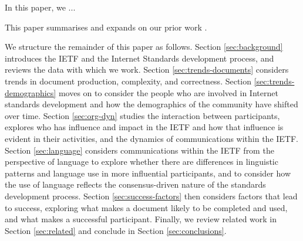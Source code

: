 \documentclass[twocolumn,10pt]{article}
\begin{document}




In this paper, we ...



This paper summarises and expands on our prior work
\cite{mcquistin:2021:characterising,khare:2022:web-we-weave,
healey:2023:power,mcquistin:2023:errare,khare:2023:tracing,
karan:2023:leda,healey:2023:power-frontiers,barnes:2024:temporal}.


We structure the remainder of this paper as follows.
Section \ref{sec:background} introduces the IETF and the Internet Standards
development process, and reviews the data with which we work.
Section \ref{sec:trends-documents} considers trends in document production,
complexity, and correctness.
Section \ref{sec:trends-demographics} moves on to consider the people who
are involved in Internet standards development and how the demographics of
the community have shifted over time.
Section \ref{sec:org-dyn} studies the interaction between participants,
explores who has influence and impact in the IETF and how that influence
is evident in their activities, and the dynamics of communications within
the IETF.
Section \ref{sec:language} considers communications within the IETF from
the perspective of language to explore whether there are differences in
linguistic patterns and language use in more influential participants,
and to consider how the use of language reflects the consensus-driven
nature of the standards development process.
Section \ref{sec:success-factors} then considers factors that lead to
success, exploring what makes a document likely to be completed and
used, and what makes a successful participant.
Finally, we review related work in Section \ref{sec:related} and conclude
in Section \ref{sec:conclusions}.
\end{document}
